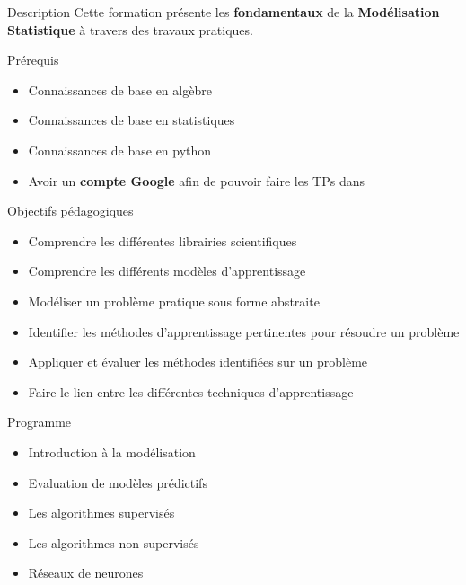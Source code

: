 \begin{frame}{Description}
  Cette formation présente les \textbf{fondamentaux} de la \textbf{Modélisation Statistique} à travers des travaux pratiques.
\end{frame}

\begin{frame}{Prérequis}
  \begin{itemize}
    \item Connaissances de base en algèbre
    \item Connaissances de base en statistiques
    \item Connaissances de base en python
  \item Avoir un \textbf{compte Google} afin de pouvoir faire les TPs dans 
  \end{itemize}
\end{frame}

\begin{frame}{Objectifs pédagogiques}
  \begin{itemize}
  \item Comprendre les différentes librairies scientifiques
  \item Comprendre les différents modèles d'apprentissage
  \item Modéliser un problème pratique sous forme abstraite
  \item Identifier les méthodes d'apprentissage pertinentes pour résoudre un problème
  \item Appliquer et évaluer les méthodes identifiées sur un problème
  \item Faire le lien entre les différentes techniques d'apprentissage
  \end{itemize}
\end{frame}

\begin{frame}{Programme}
  \begin{itemize}
  \item Introduction à la modélisation
  \item Evaluation de modèles prédictifs
  \item Les algorithmes supervisés
  \item Les algorithmes non-supervisés
  \item Réseaux de neurones
  \end{itemize}
\end{frame}
